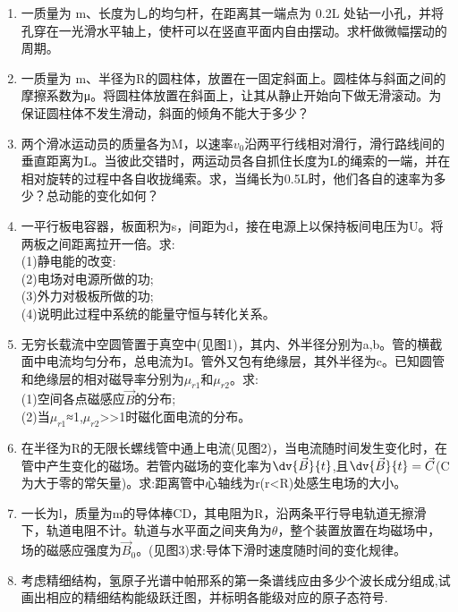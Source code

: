 \begin{enumerate}
\item 一质量为 m、长度为乚的均匀杆，在距离其一端点为 0.2L 处钻一小孔，并将孔穿在一光滑水平轴上，使杆可以在竖直平面内自由摆动。求杆做微幅摆动的周期。
\item 一质量为 m、半径为R的圆柱体，放置在一固定斜面上。圆桂体与斜面之间的摩擦系数为μ。将圆柱体放置在斜面上，让其从静止开始向下做无滑滚动。为保证圆柱体不发生滑动，斜面的倾角不能大于多少？
\item 两个滑冰运动员的质量各为M，以速率$v_0$沿两平行线相对滑行，滑行路线间的垂直距离为L。当彼此交错时，两运动员各自抓住长度为L的绳索的一端，并在相对旋转的过程中各自收拢绳索。求，当绳长为0.5L时，他们各自的速率为多少？总动能的变化如何？
\item 一平行板电容器，板面积为s，间距为d，接在电源上以保持板间电压为U。将两板之间距离拉开一倍。求:\\(1)静电能的改变:\\(2)电场对电源所做的功;\\(3)外力对极板所做的功;\\(4)说明此过程中系统的能量守恒与转化关系。
\item 无穷长载流中空圆管置于真空中(见图1)，其内、外半径分别为a,b。管的横截面中电流均匀分布，总电流为I。管外又包有绝缘层，其外半径为c。已知圆管和绝缘层的相对磁导率分别为$\mu_{r1}$和$\mu_{r2}$。求:\\
(1)空间各点磁感应$\vec B$的分布;\\
(2)当$\mu_{r1}$≈1,$\mu_{r2}$>>1时磁化面电流的分布。
\item 在半径为R的无限长螺线管中通上电流(见图2)，当电流随时间发生变化时，在管中产生变化的磁场。若管内磁场的变化率为$\displaystyle \dv{\vec B}{t}$,且$\displaystyle \dv{\vec B}{t}=\vec C$(\vec C为大于零的常矢量)。求:距离管中心轴线为r(r<R)处感生电场的大小。
\item 一长为l，质量为m的导体棒CD，其电阻为R，沿两条平行导电轨道无擦滑下，轨道电阻不计。轨道与水平面之间夹角为$\theta $，整个装置放置在均磁场中，场的磁感应强度为$\vec B_0$。(见图3)求:导体下滑时速度随时间的变化规律。
\item 考虑精细结构，氢原子光谱中帕邢系的第一条谱线应由多少个波长成分组成,试画出相应的精细结构能级跃迁图，并标明各能级对应的原子态符号.
\end{enumerate}

